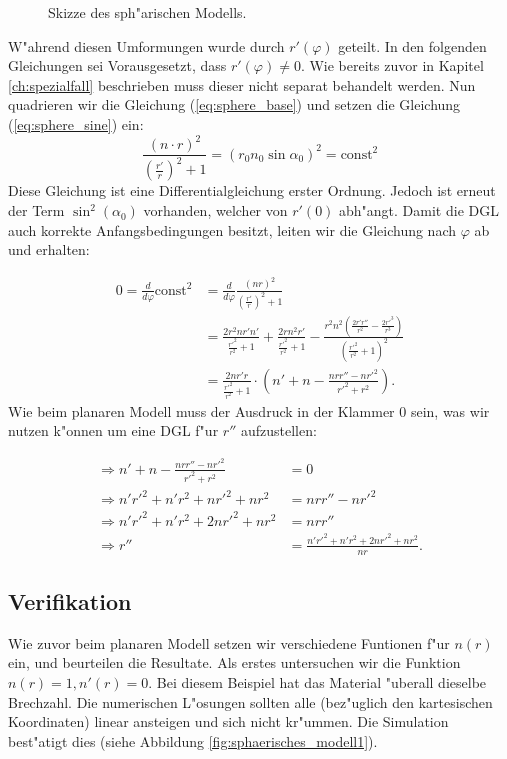 \begin{refsection}
\begin{figure}
\caption{Skizze des sph"arischen Modells. \label{fig:sphere_skizze}}
\end{figure}
W"ahrend diesen Umformungen wurde durch $r'(\varphi)$ geteilt. 
In den folgenden Gleichungen sei Vorausgesetzt, dass $r'(\varphi) \neq 0$. 
Wie bereits zuvor in Kapitel \ref{ch:spezialfall} beschrieben muss dieser nicht separat behandelt werden.
Nun quadrieren wir die Gleichung (\ref{eq:sphere_base}) und setzen die Gleichung (\ref{eq:sphere_sine}) ein:
$$\frac{(n \cdot r)^2}{\displaystyle\left( \frac{r'}{r} \right)^2 +1} = (r_0 n_0 \sin \alpha_0)^2 = \text{const}^2$$
Diese Gleichung ist eine Differentialgleichung erster Ordnung. 
Jedoch ist erneut der Term $\sin^2(\alpha_0)$ vorhanden, welcher von $r'(0)$ abh"angt. 
Damit die DGL auch korrekte Anfangsbedingungen besitzt, leiten wir die Gleichung nach $\varphi$ ab und erhalten:

\begin{equation}
\begin{aligned}
0 = \frac{d}{d\varphi} \text{const}^2 
& = \frac{d}{d\varphi}\frac{(n r)^2}{\left(\displaystyle\frac{r'}{r}\right)^2 + 1} \\
& = \frac{2 r^2 n r' n'}{\displaystyle\frac{r'^2}{r^2}+1}+\frac{2 r n^2 r'}{\displaystyle\frac{r'^2}{r^2}+1}-\frac{r^2 n^2 \left(\displaystyle\frac{2 r' r''}{r^2}-\frac{2 r'^3}{r^3}\right)}{\left(\displaystyle\frac{r'^2}{r^2}+1\right)^2} \\
& = \frac{2n r' r}{\displaystyle\frac{r'^2}{r^2}+1} \cdot \left( n' + n - \frac{n r r'' - n r'^2}{r'^2 + r^2} \right).
\end{aligned}
\end{equation}
Wie beim planaren Modell muss der Ausdruck in der Klammer $0$ sein, was wir nutzen k"onnen um eine DGL f"ur $r''$ aufzustellen:

\begin{equation} \label{eq:sphere_allg}
\begin{aligned}
\Rightarrow n' + n - \frac{n r r'' - n r'^2}{r'^2 + r^2} 
& = 0 \\
\Rightarrow n' r'^2  + n' r^2 + n r'^2 + nr^2 
& = n r r'' - n r'^2 \\
\Rightarrow n' r'^2 + n' r^2 + 2 n r'^2 + n r^2 
& = n r r'' \\
\Rightarrow r'' 
& = \frac{n' r'^2 + n' r^2 + 2 n r'^2 + n r^2}{n r}.
\end{aligned}
\end{equation}

\subsection{Verifikation}
Wie zuvor beim planaren Modell setzen wir verschiedene Funtionen f"ur $n(r)$ ein, und beurteilen die Resultate. 
Als erstes untersuchen wir die Funktion $n(r) = 1, n'(r) = 0$. 
Bei diesem Beispiel hat das Material "uberall dieselbe Brechzahl.
Die numerischen L"osungen sollten alle (bez"uglich den kartesischen Koordinaten) linear ansteigen und sich nicht kr"ummen. Die Simulation best"atigt dies (siehe Abbildung \ref{fig:sphaerisches_modell1}).


\end{refsection}
